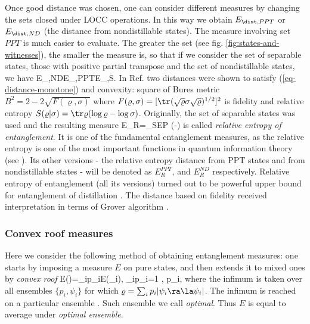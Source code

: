 \documentclass[rmp,12pt,preprint]{revtex4-2}
\begin{document}
Once good distance was chosen, one can consider different measures by
changing the sets closed under LOCC operations. In this way we
obtain $E_{\dist,PPT}$ \cite{Rains2001} or $E_{\dist,ND}$ (the distance from nondistillable states). The measure
involving set $PPT$ is much easier to evaluate. The greater the set (see fig. \ref{fig:states-and-witnesses}), the smaller the measure is, so that if we consider the set of separable states, those with positive partial transpose and the set of nondistillable states, we have
\be
E_{\dist,ND}\leq E_{\dist,PPT}\leq  E_{\dist,S}.
\ee
In Ref. \cite{PlenioVedral1998} two distances were shown to satisfy
(\ref{eq-distance-monotone}) and convexity: square of Bures metric $B^2=2-2\sqrt
{F(\varrho,\sigma)}$ where $F(\varrho,\sigma)=[\tr(\sqrt\varrho
\sigma \sqrt\varrho)^{1/2}]^2$ is fidelity
\cite{Uhlmann-fidelity,Jozsa-fidelity} and relative entropy
$S(\varrho|\sigma)=\tr\varrho(\log\varrho-\log\sigma)$.
Originally,
the set of separable states was used and the resulting measure
\be
E_R=\inf_{\sigma\in \rm SEP} \tr\varrho(\log\varrho-\log\sigma)
\label{eq:relent}
\ee
is called {\it relative entropy of entanglement}.
It  is one of the fundamental entanglement measures, as the relative
entropy is one of the most important functions in quantum
information theory (see \cite{Vedral2002-rmp,SchumacherW2000-relent}).
Its other versions -  the relative entropy distance from PPT states  \cite{Rains2001}
and from nondistillable states \cite{Vedral-distbound} -
will be denoted as $E_{R}^{PPT}$, and $E_R^{ND}$ respectively.
Relative  entropy of entanglement (all its versions)
turned out to be powerful upper bound for entanglement of
distillation \cite{Rains2001}. The distance based
on fidelity received interpretation in terms of Grover algorithm
\cite{Biham2005-ent-Grov}.

\subsubsection{Convex roof measures}
\label{subsec:roof}

Here we consider the following method of obtaining entanglement
measures: one starts by imposing a measure $E$ on pure states, and
then extends it to mixed ones by {\it convex roof}
\cite{Uhlmann-roof} \be E(\varrho)=\inf \sum_ip_iE(\psi_i),\quad
\sum_ip_i=1 ,  p_i, \ee where the infimum is taken over all
ensembles $\{p_i,\psi_i\}$ for which
$\varrho=\sum_ip_i|\psi_i\ra\la\psi_i|$. The infimum is reached on a
particular ensemble \cite{Uhlmann-roof}. Such ensemble we call {\it
optimal}. Thus $E$ is equal to average under {\it optimal ensemble}.
\end{document}
